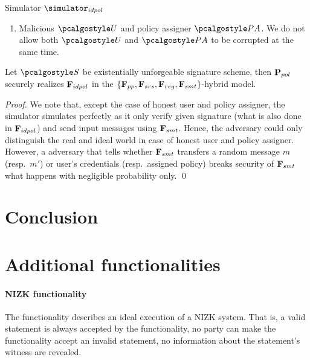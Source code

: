 \documentclass[runningheads,10pt]{llncs}
\numberwithin{equation}{section}
\begin{document}
\begin{simbox}{Simulator $\simulator_{idpol}$}
\begin{enumerate}
  \item Malicious $\user$ and policy assigner $\polas$. We do not allow both $\user$ and
    $\polas$ to be corrupted at the same time.
  \end{enumerate}
\end{simbox}

\begin{theorem}
  Let $\SIG$ be existentially unforgeable signature scheme, then $\mathbf{P}_{pol}$
  securely realizes $\mathbf{F}_{{idpol}}$ in the $\{\mathbf{F}_{{pp}}, \mathbf{F}_{{srs}},
  \mathbf{F}_{{reg}}, \mathbf{F}_{{smt}}\}$-hybrid model.
\end{theorem}

\begin{proof}
  We note that, except the case of honest user and policy assigner, the
  simulator simulates perfectly as it only verify given signature (what is also
  done in $\mathbf{F}_{{idpol}}$) and send input messages using $\mathbf{F}_{{smt}}$. Hence, the
  adversary could only distinguish the real and ideal world in case of honest
  user and policy assigner. However, a adversary that tells whether
  $\mathbf{F}_{{smt}}$ transfers a random message $m$ (resp.~$m'$) or user's
  credentials (resp.~assigned policy) breaks security of $\mathbf{F}_{{smt}}$ what
  happens with negligible probability only. \qed
\end{proof}

\section{Conclusion}





\appendix
\section{Additional functionalities}
\paragraph{NIZK functionality} The functionality describes an ideal execution
of a NIZK system. That is, a valid statement is always accepted by the
functionality, no party can make the functionality accept an invalid statement,
no information about the statement's witness are revealed.
\end{document}
